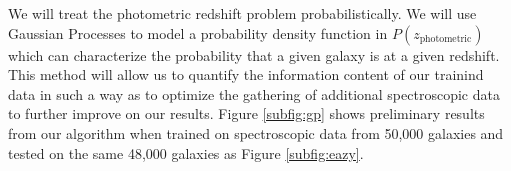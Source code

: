 \documentclass[useAMS,usenatbib,tightenlines,11pt,preprint]{aastex}
\begin{document}
We will treat the photometric redshift problem probabilistically. 
We will use Gaussian Processes to model a probability density
function in $P(z_\text{photometric})$ which can characterize the probability that a
given galaxy is at a given redshift.  This method will allow us
to quantify the information content of our trainind data in such a way as to
optimize the gathering of additional spectroscopic data to further improve on
our results.  
Figure \ref{subfig:gp} shows preliminary results from our
algorithm when trained on spectroscopic data from 50,000 galaxies and tested
on the same 48,000 galaxies as Figure \ref{subfig:eazy}.

\end{document}
